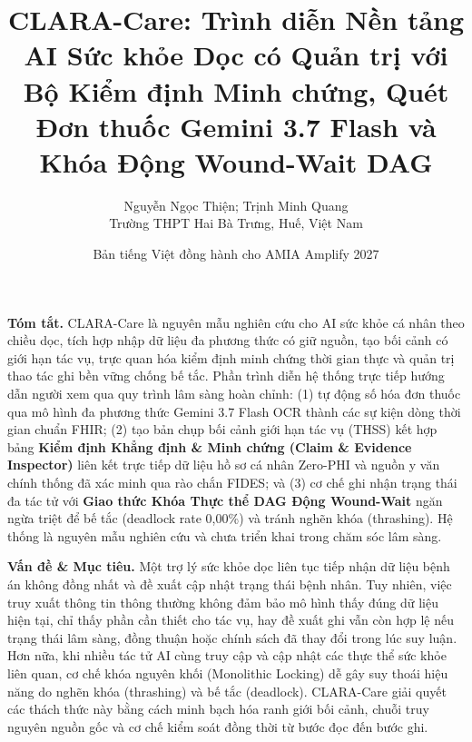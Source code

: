 \documentclass[10pt]{article}
\title{\textbf{CLARA-Care: Trình diễn Nền tảng AI Sức khỏe Dọc có Quản trị với Bộ Kiểm định Minh chứng, Quét Đơn thuốc Gemini 3.7 Flash và Khóa Động Wound-Wait DAG}}
\author{Nguyễn Ngọc Thiện; Trịnh Minh Quang \\ Trường THPT Hai Bà Trưng, Huế, Việt Nam}
\date{Bản tiếng Việt đồng hành cho AMIA Amplify 2027}
\begin{document}
\maketitle

\textbf{Tóm tắt.} CLARA-Care là nguyên mẫu nghiên cứu cho AI sức khỏe cá nhân theo chiều dọc, tích hợp nhập dữ liệu đa phương thức có giữ nguồn, tạo bối cảnh có giới hạn tác vụ, trực quan hóa kiểm định minh chứng thời gian thực và quản trị thao tác ghi bền vững chống bế tắc. Phần trình diễn hệ thống trực tiếp hướng dẫn người xem qua quy trình lâm sàng hoàn chỉnh: (1) tự động số hóa đơn thuốc qua mô hình đa phương thức Gemini 3.7 Flash OCR thành các sự kiện dòng thời gian chuẩn FHIR; (2) tạo bản chụp bối cảnh giới hạn tác vụ (THSS) kết hợp bảng \textbf{Kiểm định Khẳng định \& Minh chứng (Claim \& Evidence Inspector)} liên kết trực tiếp dữ liệu hồ sơ cá nhân Zero-PHI và nguồn y văn chính thống đã xác minh qua rào chắn FIDES; và (3) cơ chế ghi nhận trạng thái đa tác tử với \textbf{Giao thức Khóa Thực thể DAG Động Wound-Wait} ngăn ngừa triệt để bế tắc (deadlock rate 0,00\%) và tránh nghẽn khóa (thrashing). Hệ thống là nguyên mẫu nghiên cứu và chưa triển khai trong chăm sóc lâm sàng.

\textbf{Vấn đề \& Mục tiêu.} Một trợ lý sức khỏe dọc liên tục tiếp nhận dữ liệu bệnh án không đồng nhất và đề xuất cập nhật trạng thái bệnh nhân. Tuy nhiên, việc truy xuất thông tin thông thường không đảm bảo mô hình thấy đúng dữ liệu hiện tại, chỉ thấy phần cần thiết cho tác vụ, hay đề xuất ghi vẫn còn hợp lệ nếu trạng thái lâm sàng, đồng thuận hoặc chính sách đã thay đổi trong lúc suy luận. Hơn nữa, khi nhiều tác tử AI cùng truy cập và cập nhật các thực thể sức khỏe liên quan, cơ chế khóa nguyên khối (Monolithic Locking) dễ gây suy thoái hiệu năng do nghẽn khóa (thrashing) và bế tắc (deadlock). CLARA-Care giải quyết các thách thức này bằng cách minh bạch hóa ranh giới bối cảnh, chuỗi truy nguyên nguồn gốc và cơ chế kiểm soát đồng thời từ bước đọc đến bước ghi.
\end{document}
